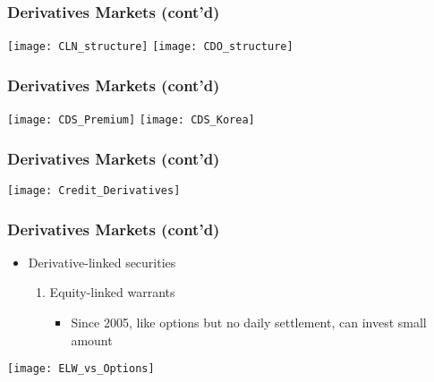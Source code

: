 \documentclass[10pt]{beamer}
\begin{document}
	\begin{frame}
		\frametitle{Derivatives Markets (cont'd)} \vspace{-5.2pt}
		
		\begin{center}
			\texttt{[image: CLN\_structure]} 
			\texttt{[image: CDO\_structure]} 
		\end{center}		
		
	\end{frame}
	
	
	\begin{frame}
		\frametitle{Derivatives Markets (cont'd)} \vspace{-5.2pt}
		
		\begin{center}
			\texttt{[image: CDS\_Premium]} 
			\texttt{[image: CDS\_Korea]} 
		\end{center}		
		
	\end{frame}
	
	
	\begin{frame}
		\frametitle{Derivatives Markets (cont'd)} \vspace{-5.2pt}
		
		\begin{center}
			\texttt{[image: Credit\_Derivatives]} 
		\end{center}		
		
	\end{frame}
	
	
	
	
	
	\begin{frame}
		\frametitle{Derivatives Markets (cont'd)}
		
		\begin{itemize}
			
			\item Derivative-linked securities
			\begin{enumerate}
				\item Equity-linked warrants
				\begin{itemize}
					\item Since 2005, like options but no daily settlement, can invest small amount
				\end{itemize} 
			\end{enumerate}
			
		\end{itemize}
		
		\begin{center}
			\texttt{[image: ELW\_vs\_Options]} 
		\end{center}	
		
	\end{frame}
	
\end{document}
